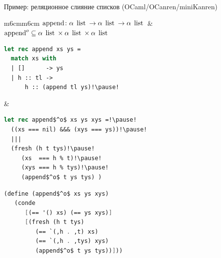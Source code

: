 \documentclass[10pt, mathserif]{beamer}
\let\\\tabularnewline
\let\\\tabularnewline
\newcommand{\oo}[1]{{#1}^o}
\newcommand{\inml}[1]{\mbox{\lstinline{#1}}}
\newcommand{\graybox}[1]{\colorbox{light-gray}{#1}}
\theoremstyle{definition}
\begin{document}
\begin{frame}[fragile]{Пример: реляционное слияние списков (OCaml/OCanren/miniKanren)}
\begin{adjustwidth}{-1.5em}{-1.5em}
\begin{tabular}{m{6cm}m{6cm}}
 \graybox{$\inml{append} \colon \alpha\:\inml{list} \to \alpha\:\inml{list} \to \alpha\:\inml{list}$} &
 \graybox{$\oo{\inml{append}}\subseteq\alpha\:\inml{list}\times\alpha\:\inml{list}\times\alpha\:\inml{list}$}\\
 \begin{lstlisting}[language=ocaml]
let rec append xs ys =
  match xs with
  | []      -> ys
  | h :: tl ->
      h :: (append tl ys)!\pause!
 \end{lstlisting} &
 \begin{lstlisting}[mathescape=true,language=ocaml]
let rec append$^o$ xs ys xys =!\pause!
  ((xs === nil) &&& (xys === ys))!\pause!
  |||
  (fresh (h t tys)!\pause!
     (xs  === h % t)!\pause!
     (xys === h % tys)!\pause!
     (append$^o$ t ys tys) )
 \end{lstlisting}
\end{tabular}\pause
\begin{center}
\begin{minipage}{6cm}
\begin{lstlisting}[mathescape=true,language=scheme]
(define (append$^o$ xs ys xys)
   (conde
      [(== '() xs) (== ys xys)]
      [(fresh (h t tys)
         (== `(,h . ,t) xs)
         (== `(,h . ,tys) xys)
         (append$^o$ t ys tys))]))
\end{lstlisting}
\end{minipage}
\end{center}

\end{adjustwidth}
\vskip5mm
\end{frame}
\end{document}
